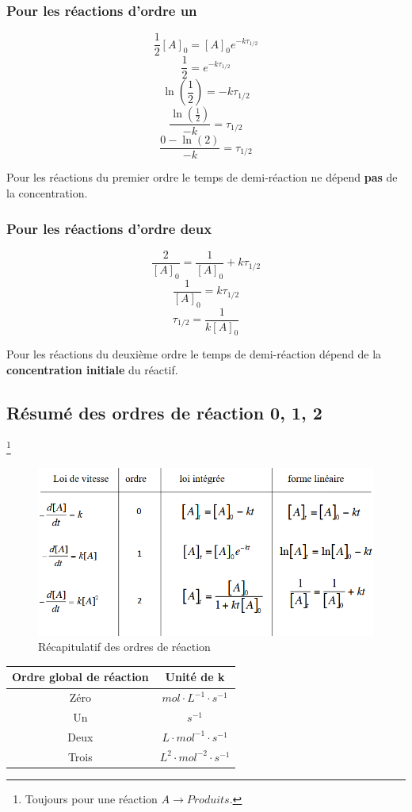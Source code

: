 \documentclass[10pt,a4paper]{book}
\begin{document}
\subsubsection{Pour les réactions d'ordre un}
\[\frac{1}{2}[A]_0 = [A]_0e^{-k\tau_{1/2}}\]
\[\frac{1}{2} = e^{-k\tau_{1/2}}\]
\[\ln(\frac{1}{2}) = -k\tau_{1/2}\]
\[\frac{\ln(\frac{1}{2})}{-k} = \tau_{1/2}\]
\[\frac{0 - \ln(2)}{-k} = \tau_{1/2}\]
\begin{center}
\end{center}
\par Pour les réactions du premier ordre le temps de demi-réaction ne dépend \textbf{pas} de la concentration.

\subsubsection{Pour les réactions d'ordre deux}
\[\frac{2}{[A]_0} = \frac{1}{[A]_0} + k\tau_{1/2}\]
\[\frac{1}{[A]_0} = k\tau_{1/2}\]
\[\tau_{1/2} = \frac{1}{k[A]_0}\]
\par Pour les réactions du deuxième ordre le temps de demi-réaction dépend de la \textbf{concentration initiale} du réactif.

\subsection{Résumé des ordres de réaction 0, 1, 2}\footnote{Toujours pour une réaction \(A \longrightarrow Produits\).}

\begin{figure}[h!]
\begin{center}
\includegraphics[scale=0.75]{./assets/reaction_order_recap.png}
\caption{Récapitulatif des ordres de réaction}
\label{fig:reaction_order_recap}
\end{center}
\end{figure}
\begin{center}
\begin{tabular}{| c | c |}
\hline
\textbf{Ordre global de réaction} & \textbf{Unité de k} \\
\hline
Zéro & \(mol\cdot L^{-1}\cdot s^{-1}\) \\
\hline
Un & \(s^{-1}\) \\
\hline
Deux & \(L\cdot mol^{-1}\cdot s^{-1}\) \\
\hline
Trois & \(L^2\cdot mol^{-2}\cdot s^{-1}\) \\
\hline
\end{tabular}
\end{center}
\end{document}
